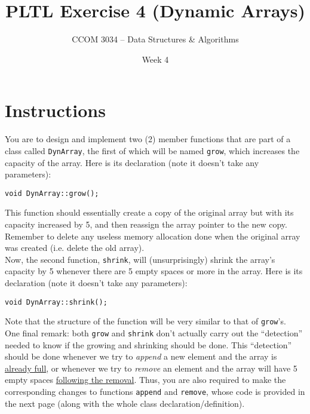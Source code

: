\documentclass[11 pt]{article}
\title{PLTL Exercise 4 (Dynamic Arrays)}
\author{CCOM 3034 – Data Structures \& Algorithms}
\date{Week 4}
\begin{document}
\maketitle



\section{Instructions}

You are to design and implement two (2) member functions that are part of a class called \texttt{DynArray}, the first of which will be named \texttt{grow}, which increases the capacity of the array. Here is its declaration (note it doesn't take any parameters):

\begin{center}
    \texttt{void DynArray::grow();}
\end{center}

\noindent This function should essentially create a copy of the original array but with its capacity increased by 5, and then reassign the array pointer to the new copy. Remember to delete any useless memory allocation done when the original array was created (i.e. delete the old array). \\

\noindent Now, the second function, \texttt{shrink}, will (unsurprisingly) shrink the array's capacity by 5 whenever there are 5 empty spaces or more in the array. Here is its declaration (note it doesn't take any parameters):

\begin{center}
    \texttt{void DynArray::shrink();}
\end{center}

\noindent Note that the structure of the function will be very similar to that of \texttt{grow}'s. \\

\noindent One final remark: both \texttt{grow} and \texttt{shrink} don't actually carry out the ``detection'' needed to know if the growing and shrinking should be done. This ``detection'' should be done whenever we try to \textit{append} a new element and the array is \underline{already full}, or whenever we try to \textit{remove} an element and the array will have 5 empty spaces \underline{following the removal}. Thus, you are also required to make the corresponding changes to functions \texttt{append} and \texttt{remove}, whose code is provided in the next page (along with the whole class declaration/definition).
\end{document}
